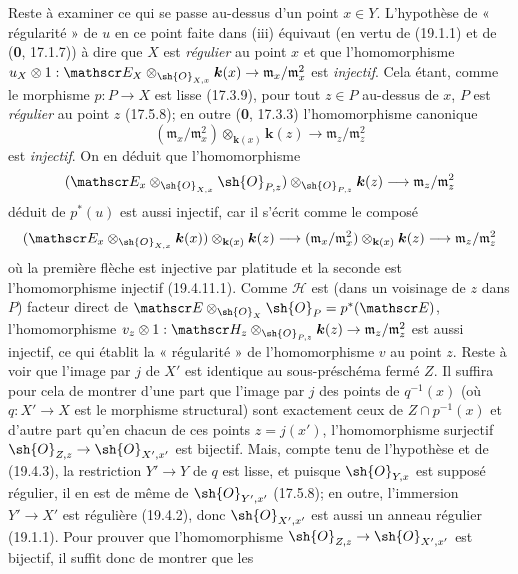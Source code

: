 Reste à examiner ce qui se passe au-dessus d'un point $x\in Y$. L'hypothèse de « régularité » de $u$ en ce point faite dans (iii) équivaut (en vertu de (19.1.1) et de (\textbf{0}, 17.1.7)) à dire que $X$ est \emph{régulier} au point $x$ et que l'homomorphisme $u_X\otimes1:\mathscr E_X\otimes_{\sh{O}_{X,x}}\boldsymbol{k}(x)\to\mathfrak m_x/\mathfrak m_x^2$ est \emph{injectif}. Cela étant, comme le morphisme $p:P\to X$ est lisse (17.3.9), pour tout $z\in P$ au-dessus de $x$, $P$ est \emph{régulier} au point $z$ (17.5.8); en outre (\textbf{0}, 17.3.3) l'homomorphisme canonique
\begin{equation}
  (\mathfrak m_x/\mathfrak m_x^2)\otimes_{\mathbf k(x)}\boldsymbol{k}(z)\longrightarrow\mathfrak m_z/\mathfrak m_z^2
  \tag{19.4.11.1}\label{IV.19.4.11.1}
\end{equation}
est \emph{injectif}. On en déduit que l'homomorphisme
\[
  (\mathscr E_x\otimes_{\sh{O}_{X,x}}\sh{O}_{P,z})\otimes_{\sh{O}_{P,z}}\boldsymbol{k}(z)\longrightarrow\mathfrak m_z/\mathfrak m_z^2
\]
déduit de $p^*(u)$ est aussi injectif, car il s'écrit comme le composé
\[
  (\mathscr E_x\otimes_{\sh{O}_{X,x}}\boldsymbol{k}(x))\otimes_{\mathbf k(x)}\boldsymbol{k}(z)\longrightarrow(\mathfrak m_x/\mathfrak m_x^2)\otimes_{\mathbf k(x)}\boldsymbol{k}(z)\longrightarrow\mathfrak m_z/\mathfrak m_z^2
\]
où la première flèche est injective par platitude et la seconde est l'homomorphisme injectif (19.4.11.1). Comme $\mathscr H$ est (dans un voisinage de $z$ dans $P$) facteur direct de $\mathscr E\otimes_{\sh{O}_X}\sh{O}_P=p^*(\mathscr E)$, l'homomorphisme $v_z\otimes1:\mathscr H_z\otimes_{\sh{O}_{P,z}}\boldsymbol{k}(z)\to\mathfrak m_z/\mathfrak m_z^2$ est aussi injectif, ce qui établit la « régularité » de l'homomorphisme $v$ au point $z$. Reste à voir que l'image par $j$ de $X'$ est identique au sous-préschéma fermé $Z$. Il suffira pour cela de montrer d'une part que l'image par $j$ des points de $q^{-1}(x)$ (où $q:X'\to X$ est le morphisme structural) sont exactement ceux de $Z\cap p^{-1}(x)$ et d'autre part qu'en chacun de ces points $z=j(x')$, l'homomorphisme surjectif $\sh{O}_{Z,z}\to\sh{O}_{X',x'}$ est bijectif. Mais, compte tenu de l'hypothèse et de (19.4.3), la restriction $Y'\to Y$ de $q$ est lisse, et puisque $\sh{O}_{Y,x}$ est supposé régulier, il en est de même de $\sh{O}_{Y',x'}$ (17.5.8); en outre, l'immersion $Y'\to X'$ est régulière (19.4.2), donc $\sh{O}_{X',x'}$ est aussi un anneau régulier (19.1.1). Pour prouver que l'homomorphisme $\sh{O}_{Z,z}\to\sh{O}_{X',x'}$ est bijectif, il suffit donc de montrer que les
